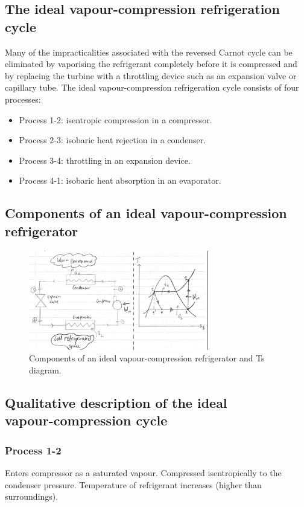 \documentclass[class=report, crop=false, 12pt,a4paper]{standalone}
\begin{document}
\subsection{The ideal vapour-compression refrigeration cycle}
Many of the impracticalities associated with the reversed Carnot cycle can be eliminated by vaporising the refrigerant completely before it is compressed and by replacing the turbine with a throttling device such as an expansion valve or capillary tube. The ideal vapour-compression refrigeration cycle consists of four processes:
\begin{itemize}[noitemsep]
  \item Process 1-2: isentropic compression in a compressor.
  \item Process 2-3: isobaric heat rejection in a condenser.
  \item Process 3-4: throttling in an expansion device.
  \item Process 4-1: isobaric heat absorption in an evaporator.
\end{itemize}
\subsection{Components of an ideal vapour-compression refrigerator}
\begin{figure}
  \centering
  \includegraphics[width = 0.7\textwidth]{../img/ComponentsAndTsIdealVCR}
  \caption{Components of an ideal vapour-compression refrigerator and Ts diagram.}
\end{figure}
\subsection{Qualitative description of the ideal \\ vapour-compression cycle}
\subsubsection{Process 1-2}
Enters compressor as a saturated vapour. Compressed isentropically to the condenser pressure. Temperature of refrigerant increases (higher than surroundings).
\end{document}
